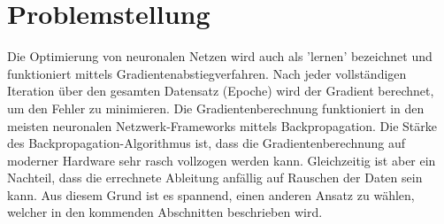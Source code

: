 %
%
%
\section{Problemstellung
\label{ableitung:section:problemstellung}}
Die Optimierung von neuronalen Netzen wird auch als 'lernen' bezeichnet und funktioniert mittels Gradientenabstiegverfahren.
Nach jeder vollständigen Iteration über den gesamten Datensatz (Epoche) wird der Gradient berechnet, um den Fehler zu minimieren. Die Gradientenberechnung funktioniert in den meisten neuronalen Netzwerk-Frameworks mittels Backpropagation. Die Stärke des Backpropagation-Algorithmus ist, dass die Gradientenberechnung auf moderner Hardware sehr rasch vollzogen werden kann. Gleichzeitig ist aber ein Nachteil, dass die errechnete Ableitung anfällig auf Rauschen der Daten sein kann. Aus diesem Grund ist es spannend, einen anderen Ansatz zu wählen, welcher in den kommenden Abschnitten beschrieben wird.

